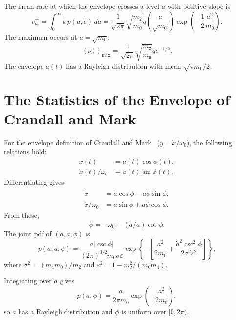 \documentclass[12pt]{article}
\theoremstyle{plain}
\theoremstyle{definition}
\theoremstyle{remark}
\theoremstyle{plain}
\theoremstyle{definition}
\begin{document}
The mean rate at which the envelope crosses a level $a$ with positive slope is
\begin{equation}
    \nu_a^+ = \int_0^\infty \dot{a} \, p(a, \dot{a}) \, d\dot{a} = \frac{1}{\sqrt{2\pi}} \sqrt{\frac{m_2}{m_0}} q \left( \frac{a}{\sqrt{m_0}} \right) \exp\left( -\frac{1}{2} \frac{a^2}{m_0} \right).
    \label{eq:envelope_crossing}
\end{equation}
The maximum occurs at $a = \sqrt{m_0}$:
\begin{equation}
    (\nu_a^+)_{\max} = \frac{1}{\sqrt{2\pi}} \sqrt{\frac{m_2}{m_0}} q e^{-1/2}.
    \label{eq:envelope_crossing_max}
\end{equation}
The envelope $a(t)$ has a Rayleigh distribution with mean $\sqrt{\pi m_0 / 2}$.

\section{The Statistics of the Envelope of Crandall and Mark}
\label{sec:crandall_stats}
For the envelope definition of Crandall and Mark~\cite{crandall1963} ($y = \dot{x}/\omega_0$), the following relations hold:
\begin{align}
    x(t) &= a(t) \cos \phi(t), \label{eq:crandall_x} \\
    \dot{x}(t)/\omega_0 &= a(t) \sin \phi(t). \label{eq:crandall_xdot}
\end{align}
Differentiating gives
\begin{align}
    \dot{x} &= \dot{a} \cos \phi - a \dot{\phi} \sin \phi, \\
    \ddot{x}/\omega_0 &= \dot{a} \sin \phi + a \dot{\phi} \cos \phi.
\end{align}
From these,
\begin{equation}
    \dot{\phi} = -\omega_0 + (\dot{a}/a) \cot \phi.
    \label{eq:crandall_phidot}
\end{equation}
The joint pdf of $(a, \dot{a}, \phi)$ is
\begin{equation}
    p(a, \dot{a}, \phi) = \frac{a |\csc \phi|}{(2\pi)^{3/2} m_0 \sigma \varepsilon} \exp\left\{ -\left[ \frac{a^2}{2 m_0} + \frac{\dot{a}^2 \csc^2 \phi}{2 \sigma^2 \varepsilon^2} \right] \right\},
    \label{eq:crandall_joint}
\end{equation}
where $\sigma^2 = (m_4 m_0)/m_2$ and $\varepsilon^2 = 1 - m_2^2/(m_0 m_4)$.

Integrating over $\dot{a}$ gives
\begin{equation}
    p(a, \phi) = \frac{a}{2\pi m_0} \exp\left( -\frac{a^2}{2 m_0} \right),
\end{equation}
so $a$ has a Rayleigh distribution and $\phi$ is uniform over $[0, 2\pi)$.
\end{document}
